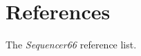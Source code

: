 %
%
%

\section{References}
\label{sec:seq66_references}

   The \textsl{Sequencer66} reference list.

